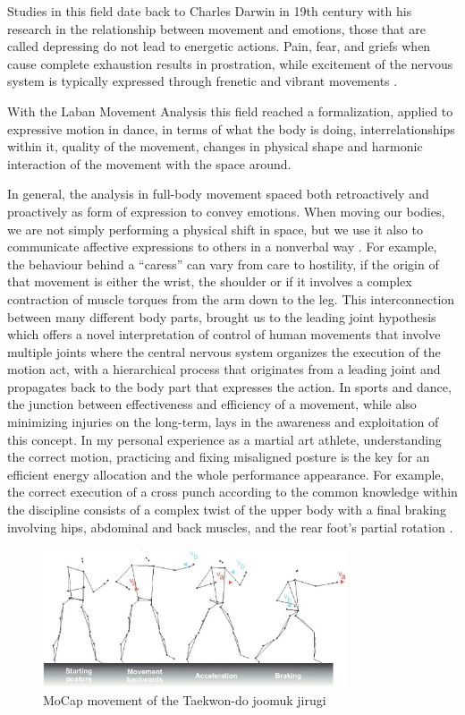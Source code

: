 Studies in this field date back to Charles Darwin in 19th century with his research in the relationship 
between movement and emotions, those that are called depressing do not lead to energetic actions. 
Pain, fear, and griefs when cause complete exhaustion results in prostration, 
while excitement of the nervous system is typically expressed through frenetic and vibrant movements \cite{darwin}.  

With the Laban Movement Analysis this field reached a formalization, applied to expressive motion in dance, 
in terms of what the body is doing, interrelationships within it, quality of the movement, 
changes in physical shape and harmonic interaction of the movement with the space around. 

In general, the analysis in full-body movement spaced both retroactively and proactively as form of expression to convey emotions. 
When moving our bodies, we are not simply performing a physical shift in space, but we use it also to 
communicate affective expressions to others in a nonverbal way \cite{gelder:2009,kleinsmith:2013,karg:2013}. 
For example, the behaviour behind a “caress” can vary from care to hostility, 
if the origin of that movement is either the wrist, the shoulder or if it involves a complex 
contraction of muscle torques from the arm down to the leg. 
This interconnection between many different body parts, brought us to the leading joint hypothesis \cite{dounskaia:2010} 
which offers a novel interpretation of control of human movements that involve multiple joints 
where the central nervous system organizes the execution of the motion act, with a hierarchical process 
that originates from a leading joint and propagates back to the body part that expresses the action. 
In sports and dance, the junction between effectiveness and efficiency of a movement, while also minimizing injuries on the long-term, 
lays in the awareness and exploitation of this concept. 
In my personal experience as a martial art athlete, understanding the correct motion, 
practicing and fixing misaligned posture is the key for an efficient energy allocation and the whole performance appearance. 
For example, the correct execution of a cross punch according to the common 
knowledge within the discipline consists of a complex 
twist of the upper body with a final braking involving hips, abdominal and back muscles, 
and the rear foot’s partial rotation \cite{wasik:2013}.
\begin{figure}[H]
    \centering
    \includegraphics[width=0.8\textwidth]{graphics/Taekwon-do-joomuk-jirugi.jpeg}
    \caption{MoCap movement of the Taekwon-do joomuk jirugi}
    \label{fig:example}
\end{figure}